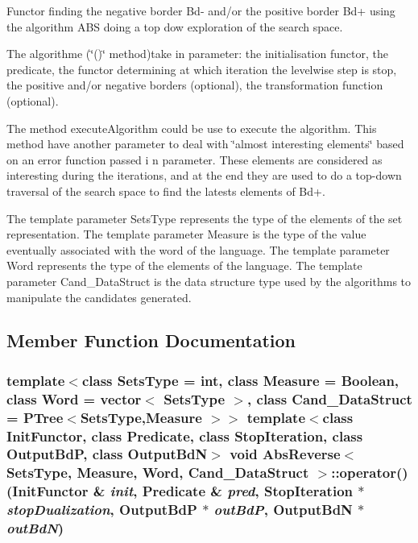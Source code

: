 Functor finding the negative border Bd- and/or the positive border Bd+ using the algorithm ABS doing a top dow exploration of the search space. 

The algorithme (\char`\"{}()\char`\"{} method)take in parameter: the initialisation functor, the predicate, the functor determining at which iteration the levelwise step is stop, the positive and/or negative borders (optional), the transformation function (optional).

The method execute\-Algorithm could be use to execute the algorithm. This method have another parameter to deal with \char`\"{}almost interesting elements\char`\"{} based on an error function passed i n parameter. These elements are considered as interesting during the iterations, and at the end they are used to do a top-down traversal of the search space to find the latests elements of Bd+.

The template parameter Sets\-Type represents the type of the elements of the set representation. The template parameter Measure is the type of the value eventually associated with the word of the language. The template parameter Word represents the type of the elements of the language. The template parameter Cand\_\-Data\-Struct is the data structure type used by the algorithms to manipulate the candidates generated. 



\subsection{Member Function Documentation}
\subsubsection{\setlength{\rightskip}{0pt plus 5cm}template$<$class Sets\-Type = int, class Measure = Boolean, class Word = vector$<$ Sets\-Type $>$, class Cand\_\-Data\-Struct = PTree$<$Sets\-Type,Measure $>$$>$ template$<$class Init\-Functor, class Predicate, class Stop\-Iteration, class Output\-Bd\-P, class Output\-Bd\-N$>$ void {\bf Abs\-Reverse}$<$ Sets\-Type, Measure, Word, Cand\_\-Data\-Struct $>$::operator() (Init\-Functor \& {\em init}, {\bf Predicate} \& {\em pred}, Stop\-Iteration $\ast$ {\em stop\-Dualization}, Output\-Bd\-P $\ast$ {\em out\-Bd\-P}, Output\-Bd\-N $\ast$ {\em out\-Bd\-N})\hspace{0.3cm}{\tt  [inline]}}\label{class_abs_reverse_783d932854ce93bd14518406996d8090}


